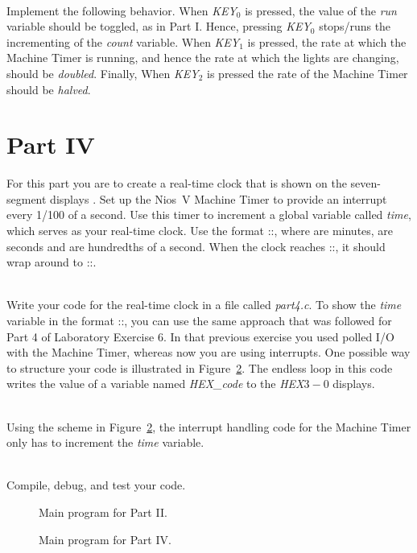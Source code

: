 \documentclass[epsfig,10pt,fullpage]{article}
\newcommand{\CommonDocsPath}{../../../../common/docs}
\begin{document}
~\\
Implement the following behavior. When {\it KEY}$_0$ is pressed, the value of the {\it run}
variable should be toggled, as in Part I. Hence, pressing {\it KEY}$_0$ stops/runs
the incrementing of the {\it count} variable. When {\it KEY}$_1$ is pressed, the rate at which
the Machine Timer is running, and hence the rate at which the  lights are 
changing, should be {\it doubled}. Finally, When {\it KEY}$_2$ is pressed the rate of the 
Machine Timer should be {\it halved}. 

\section*{ Part IV}
For this part you are to create a real-time clock that is shown on the seven-segment 
displays . Set up the Nios~V Machine Timer to provide an interrupt every 
1/100 of a second. Use this timer to increment a global variable called {\it time}, which
serves as your real-time clock. Use the format ::, where 
 are minutes,  are seconds and  are hundredths of a second.
When the clock reaches ::, it should wrap around to 
::.

~\\
Write your code for the real-time clock in a file called {\it part4.c}. To show the 
{\it time} variable in the format ::, you can use the same 
approach that was followed for Part 4 of Laboratory Exercise 6.
In that previous exercise you used polled I/O with the Machine Timer,
whereas now you are using interrupts. One possible way to structure your code is illustrated in
Figure~\ref{fig:code4}. The endless loop in this code writes the value of a variable named
{\it HEX\_code} to the {\it HEX}$3-0$ displays.

~\\
Using the scheme in Figure~\ref{fig:code4}, the interrupt handling code for the 
Machine Timer only has to increment the {\it time} variable.

~\\
Compile, debug, and test your code.

\begin{figure}[ ]
\begin{center}

\end{center}
\vspace{-1.cm}\caption{Main program for Part II.}
\label{fig:code2}
\end{figure}

\begin{figure}[ ]
\begin{center}
\begin{minipage}[h]{15.5 cm}

\vspace{-0cm}\caption{Main program for Part IV.}
\label{fig:code4}
\end{minipage}
\end{center}
\end{figure}




\end{document}
